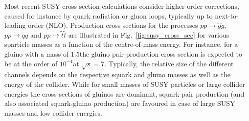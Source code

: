 Most recent SUSY cross section calculations consider higher order corrections, caused for instance by quark radiation or gluon loops, typically up to next-to-leading order (NLO). Production cross sections for the processes $pp \rightarrow \tilde{g}\tilde{g}$, $pp \rightarrow \tilde{q}\tilde{q}$ and $pp \rightarrow \tilde{t}\tilde{t}$ are illustrated in Fig.~\ref{fig:susy_cross_sec} for various sparticle masses as a function of the centre-of-mass energy. For instance, for a gluino with a mass of 1.5\tev the gluino pair-production cross section is expected to be at the order of $10^{-4}$\pb at $\sqrt{s} = 7$\tev. Typically, the relative size of the different channels depends on the respective squark and gluino masses as well as the energy of the collider. While for small masses of SUSY particles or large collider energies the cross sections of gluinos are dominant, squark-pair production (and also associated squark-gluino production) are favoured in case of large SUSY masses and low collider energies. 

